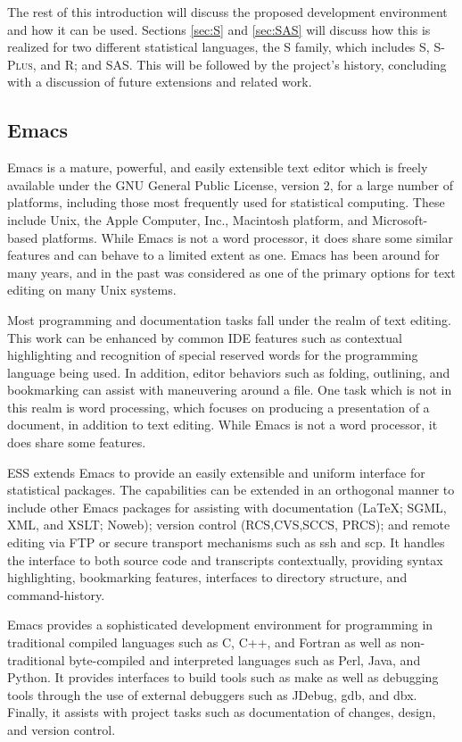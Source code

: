 \documentclass{article}
\newcommand*{\Splus}{\textsc{S-Plus}}
\begin{document}
The rest of this introduction will discuss the proposed development
environment and how it can be used.  Sections \ref{sec:S} and
\ref{sec:SAS} will discuss how this is realized for two different
statistical languages, the S family, which includes S, \Splus, and R;
and SAS.  This will be followed by the project's history, concluding
with a discussion of future extensions and related work.

\subsection{Emacs}
\label{sec:intro:emacs}

Emacs \citep{RMS:2000} is a mature, powerful, and easily extensible
text editor which is freely available under the GNU General Public
License, version 2, for a large number of platforms, including those
most frequently used for statistical computing.  These include Unix,
the Apple Computer, Inc., Macintosh platform, and Microsoft-based
platforms.  While Emacs is not a word processor, it does share some
similar features and can behave to a limited extent as one.  Emacs has
been around for many years, and in the past was considered as one of
the primary options for text editing on many Unix systems.

Most programming and documentation tasks fall under the realm of text
editing.  This work can be enhanced by common IDE features such as
contextual highlighting and recognition of special reserved words for
the programming language being used.  In addition, editor behaviors
such as folding, outlining, and bookmarking can assist with
maneuvering around a file.  One task which is not in this realm is
word processing, which focuses on producing a presentation of a
document, in addition to text editing.  While Emacs is not a word
processor, it does share some features.

ESS extends Emacs to provide an easily extensible and uniform
interface for statistical packages.  The capabilities can be extended
in an orthogonal manner to include other Emacs packages for assisting
with documentation (\LaTeX; SGML, XML, and XSLT; Noweb); version
control (RCS,CVS,SCCS, PRCS); and remote editing via FTP or secure
transport mechanisms such as ssh and scp.  It handles the interface to
both source code and transcripts contextually, providing syntax
highlighting, bookmarking features, interfaces to directory structure,
and command-history.

Emacs provides a sophisticated development environment for programming
in traditional compiled languages such as C, C++, and Fortran as well
as non-traditional byte-compiled and interpreted languages such as
Perl, Java, and Python.  It provides interfaces to build tools such as
make as well as debugging tools through the use of external debuggers
such as JDebug, gdb, and dbx.  Finally, it assists with project tasks
such as documentation of changes, design, and version control.
\end{document}

